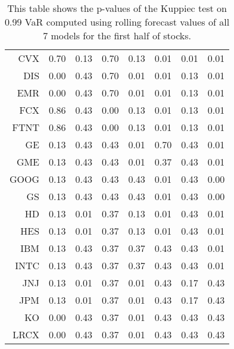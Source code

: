 \begin{table}[ht]
\begin{tabular}{rrrrrrrr}
  CVX & 0.70 & 0.13 & 0.70 & 0.13 & 0.01 & 0.01 & 0.01 \\ 
  DIS & 0.00 & 0.43 & 0.70 & 0.01 & 0.01 & 0.13 & 0.01 \\ 
  EMR & 0.00 & 0.43 & 0.70 & 0.01 & 0.01 & 0.13 & 0.01 \\ 
  FCX & 0.86 & 0.43 & 0.00 & 0.13 & 0.01 & 0.13 & 0.01 \\ 
  FTNT & 0.86 & 0.43 & 0.00 & 0.13 & 0.01 & 0.13 & 0.01 \\ 
  GE & 0.13 & 0.43 & 0.43 & 0.01 & 0.70 & 0.43 & 0.01 \\ 
  GME & 0.13 & 0.43 & 0.43 & 0.01 & 0.37 & 0.43 & 0.01 \\ 
  GOOG & 0.13 & 0.43 & 0.43 & 0.43 & 0.01 & 0.43 & 0.00 \\ 
  GS & 0.13 & 0.43 & 0.43 & 0.43 & 0.01 & 0.43 & 0.00 \\ 
  HD & 0.13 & 0.01 & 0.37 & 0.13 & 0.01 & 0.43 & 0.01 \\ 
  HES & 0.13 & 0.01 & 0.37 & 0.13 & 0.01 & 0.43 & 0.01 \\ 
  IBM & 0.13 & 0.43 & 0.37 & 0.37 & 0.43 & 0.43 & 0.01 \\ 
  INTC & 0.13 & 0.43 & 0.37 & 0.37 & 0.43 & 0.43 & 0.01 \\ 
  JNJ & 0.13 & 0.01 & 0.37 & 0.01 & 0.43 & 0.17 & 0.43 \\ 
  JPM & 0.13 & 0.01 & 0.37 & 0.01 & 0.43 & 0.17 & 0.43 \\ 
  KO & 0.00 & 0.43 & 0.37 & 0.01 & 0.43 & 0.43 & 0.43 \\ 
  LRCX & 0.00 & 0.43 & 0.37 & 0.01 & 0.43 & 0.43 & 0.43 \\ 
   \hline
\end{tabular}
\caption[Kupiec test p-values, alpha =0.99 (1)]{This table shows the p-values of the Kuppiec test on 0.99 VaR computed using rolling forecast values of all 7 models for the first half of stocks.} 
\label{Table:Kupiec_test_rolling_0.99_1}
\end{table}
